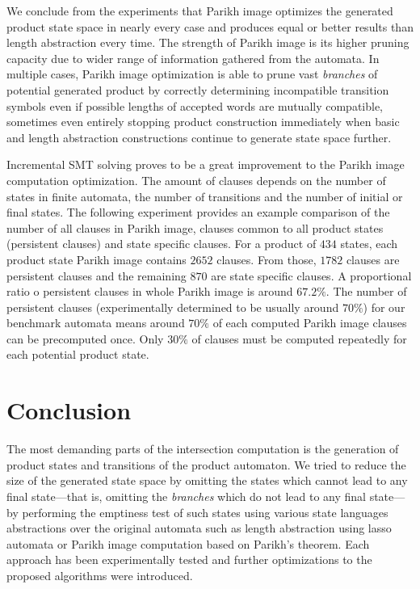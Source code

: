 
We conclude from the experiments that Parikh image optimizes the generated product state space in nearly every case and produces equal or better results than length abstraction every time. The strength of Parikh image is its higher pruning capacity due to wider range of information gathered from the automata. In multiple cases, Parikh image optimization is able to prune vast \emph{branches} of potential generated product by correctly determining incompatible transition symbols even if possible lengths of accepted words are mutually compatible, sometimes even entirely stopping product construction immediately when basic and length abstraction constructions continue to generate state space further.

Incremental SMT solving proves to be a great improvement to the Parikh image computation optimization. The amount of clauses depends on the number of states in finite automata, the number of transitions and the number of initial or final states. The following experiment provides an example comparison of the number of all clauses in Parikh image, clauses common to all product states (persistent clauses) and state specific clauses. For a product of $434$ states, each product state Parikh image contains $2652$ clauses. From those, $1782$ clauses are persistent clauses and the remaining $870$ are state specific clauses. A proportional ratio o persistent clauses in whole Parikh image is around $67.2 \%$. The number of persistent clauses (experimentally determined to be usually around $70 \%$) for our benchmark automata means around $70\%$ of each computed Parikh image clauses can be precomputed once. Only $30\%$ of clauses must be computed repeatedly for each potential product state.

\chapter{Conclusion}

The most demanding parts of the intersection computation is the generation of product states and transitions of the product automaton. We tried to reduce the size of the generated state space by omitting the states which cannot lead to any final state---that is, omitting the \textit{branches} which do not lead to any final state---by performing the emptiness test of such states using various state languages abstractions over the original automata such as length abstraction using lasso automata or Parikh image computation based on Parikh's theorem. Each approach has been experimentally tested and further optimizations to the proposed algorithms were introduced.

